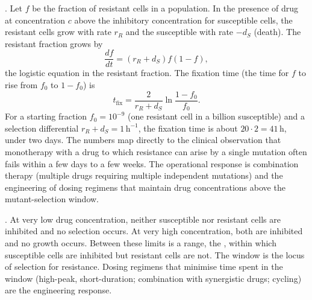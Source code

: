 . Let $f$ be the
fraction of resistant cells in a population. In the presence of drug
at concentration $c$ above the inhibitory concentration for
susceptible cells, the resistant cells grow with rate $r_R$ and the
susceptible with rate $-d_S$ (death). The resistant fraction grows by
\[
\frac{df}{dt} = (r_R + d_S) f (1 - f),
\]
the logistic equation in the resistant fraction. The fixation time
(the time for $f$ to rise from $f_0$ to $1 - f_0$) is
\[
t_{\text{fix}} = \frac{2}{r_R + d_S} \ln \frac{1 - f_0}{f_0}.
\]
For a starting fraction $f_0 = 10^{-9}$ (one resistant cell in a
billion susceptible) and a selection differential $r_R + d_S = 1\,
\text{h}^{-1}$, the fixation time is about $20 \cdot 2 = 41\,\text{h}$,
under two days. The numbers map directly to the clinical observation
that monotherapy with a drug to which resistance can arise by a
single mutation often fails within a few days to a few weeks. The
operational response is combination therapy (multiple drugs requiring
multiple independent mutations) and the engineering of dosing
regimens that maintain drug concentrations above the
mutant-selection window.

. At very low drug concentration,
neither susceptible nor resistant cells are inhibited and no
selection occurs. At very high concentration, both are inhibited and
no growth occurs. Between these limits is a range, the
, within which susceptible cells
are inhibited but resistant cells are not. The window is the locus
of selection for resistance. Dosing regimens that minimise time
spent in the window (high-peak, short-duration; combination with
synergistic drugs; cycling) are the engineering response.



